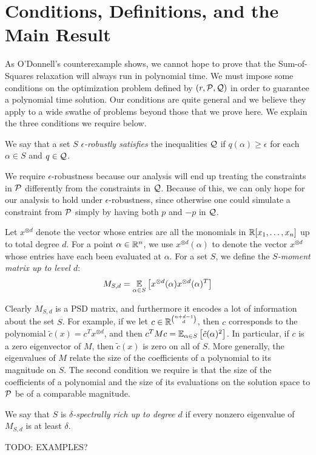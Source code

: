 \section{Conditions, Definitions, and the Main Result}
As O'Donnell's counterexample shows, we cannot hope to prove that the Sum-of-Squares relaxation will always run in polynomial time. We must impose some conditions on the optimization problem defined by $(r, \mathcal P, \mathcal Q)$ in order to guarantee a polynomial time solution. Our conditions are quite general and we believe they apply to a wide swathe of problems beyond those that we prove here. We explain the three conditions we require below.

\begin{definition}
We say that a set $S$ \emph{$\epsilon$-robustly satisfies} the inequalities $\mathcal Q$ if $q(\alpha) \geq \epsilon$ for each $\alpha \in S$ and $q \in \mathcal Q$. 
\end{definition}
We require $\epsilon$-robustness because our analysis will end up treating the constraints in $\mathcal P$ differently from the constraints in $\mathcal Q$.
Because of this, we can only hope for our analysis to hold under $\epsilon$-robustness, since otherwise one could simulate a constraint from $\mathcal P$ simply by having both $p$ and $-p$ in $\mathcal Q$. 

\begin{definition}
Let $x^{\otimes d}$ denote the vector whose entries are all the monomials in $\mathbb R[x_1,\dots,x_n]$ up to total degree $d$. 
For a point $\alpha \in \mathbb R^n$, we use $x^{\otimes d}(\alpha)$ to denote the vector $x^{\otimes d}$ whose entries have each been evaluated at $\alpha$.
For a set $S$, we define the \emph{$S$-moment matrix up to level $d$}:
\[M_{S,d} = \operatorname*{\mathbb{E}}_{\alpha \in S}\left[x^{\otimes d}(\alpha)x^{\otimes d}(\alpha)^T\right]\]
\end{definition}
Clearly $M_{S,d}$ is a PSD matrix, and furthermore it encodes a lot of information about the set $S$. For example, if we let $c \in \mathbb R^{\binom{n+d-1}{d}}$, then $c$ corresponds to the polynomial $\tilde{c}(x) = c^Tx^{\otimes d}$, and then $c^TMc = \operatorname*{\mathbb{E}}_{\alpha \in S}\left[\tilde{c}(\alpha)^2\right]$.
In particular, if $c$ is a zero eigenvector of $M$, then $\tilde{c}(x)$ is zero on all of $S$. 
More generally, the eigenvalues of $M$ relate the size of the coefficients of a polynomial to its magnitude on $S$. 
The second condition we require is that the size of the coefficients of a polynomial and the size of its evaluations on the solution space to $\mathcal P$ be of a comparable magnitude.
\begin{definition}
We say that $S$ is \emph{$\delta$-spectrally rich up to degree $d$} if every nonzero eigenvalue of $M_{S,d}$ is at least $\delta$. 
\end{definition}
TODO: EXAMPLES?

